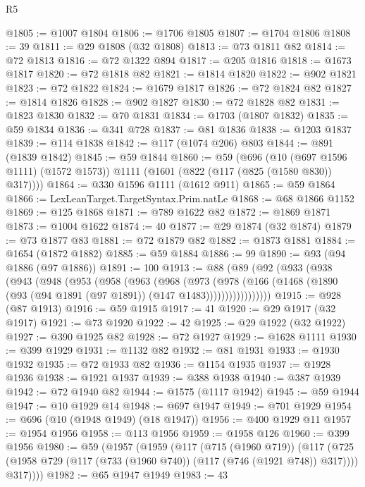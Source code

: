 \begin{lexlean}{R5}
\begin{coremodule}
{{{{{{{{{{{{{{{{{{{{{{{{{{{{{{{{{{{{{{{{{{{{{{{{{{{{{{{{{{{{{{{{{{{{{{{{{{{{{{{{{{{{{{{{{{{{@1805 := @1007 @1804
@1806 := @1706 @1805
@1807 := @1704 @1806
@1808 := 39
@1811 := @29 @1808 (@32 @1808)
@1813 := @73 @1811 @82
@1814 := @72 @1813
@1816 := @72 @1322 @894
@1817 := @205 @1816
@1818 := @1673 @1817
@1820 := @72 @1818 @82
@1821 := @1814 @1820
@1822 := @902 @1821
@1823 := @72 @1822
@1824 := @1679 @1817
@1826 := @72 @1824 @82
@1827 := @1814 @1826
@1828 := @902 @1827
@1830 := @72 @1828 @82
@1831 := @1823 @1830
@1832 := @70 @1831
@1834 := @1703 (@1807 @1832)
@1835 := @59 @1834
@1836 := @341 @728
@1837 := @81 @1836
@1838 := @1203 @1837
@1839 := @114 @1838
@1842 := @117 (@1074 @206) @803
@1844 := @891 (@1839 @1842)
@1845 := @59 @1844
@1860 := @59
    (@696
      (@10 (@697 @1596 @1111) (@1572 @1573))
      @1111
      (@1601 (@822 (@117 (@825 (@1580 @830)) @317))))
@1864 := @330 @1596 @1111 (@1612 @911)
@1865 := @59 @1864
@1866 := LexLeanTarget.TargetSyntax.Prim.natLe
@1868 := @68 @1866 @1152
@1869 := @125 @1868
@1871 := @789 @1622 @82
@1872 := @1869 @1871
@1873 := @1004 @1622
@1874 := 40
@1877 := @29 @1874 (@32 @1874)
@1879 := @73 @1877 @83
@1881 := @72 @1879 @82
@1882 := @1873 @1881
@1884 := @1654 (@1872 @1882)
@1885 := @59 @1884
@1886 := 99
@1890 := @93 (@94 @1886 (@97 @1886))
@1891 := 100
@1913 := @88
    (@89
      (@92
        (@933
          (@938
            (@943
              (@948
                (@953
                  (@958
                    (@963
                      (@968
                        (@973
                          (@978
                            (@166
                              (@1468
                                (@1890 (@93 (@94 @1891 (@97 @1891)) (@147 @1483)))))))))))))))))
@1915 := @928 (@87 @1913)
@1916 := @59 @1915
@1917 := 41
@1920 := @29 @1917 (@32 @1917)
@1921 := @73 @1920
@1922 := 42
@1925 := @29 @1922 (@32 @1922)
@1927 := @390 @1925 @82
@1928 := @72 @1927
@1929 := @1628 @1111
@1930 := @399 @1929
@1931 := @1132 @82
@1932 := @81 @1931
@1933 := @1930 @1932
@1935 := @72 @1933 @82
@1936 := @1154 @1935
@1937 := @1928 @1936
@1938 := @1921 @1937
@1939 := @388 @1938
@1940 := @387 @1939
@1942 := @72 @1940 @82
@1944 := @1575 (@1117 @1942)
@1945 := @59 @1944
@1947 := @10 @1929 @14
@1948 := @697 @1947
@1949 := @701 @1929
@1954 := @696 (@10 (@1948 @1949) (@18 @1947))
@1956 := @400 @1929 @11
@1957 := @1954 @1956
@1958 := @113 @1956
@1959 := @1958 @126
@1960 := @399 @1956
@1980 := @59
    (@1957
      (@1959
        (@117
          (@715 (@1960 @719))
          (@117
            (@725 (@1958 @729 (@117 (@733 (@1960 @740)) (@117 (@746 (@1921 @748)) @317))))
            @317))))
@1982 := @65 @1947 @1949
@1983 := 43
}}}}}}}}}}}}}}}}}}}}}}}}}}}}}}}}}}}}}}}}}}}}}}}}}}}}}}}}}}}}}}}}}}}}}}}}}}}}}}}}}}}}}}}}}}}}
\end{coremodule}
\end{lexlean}
